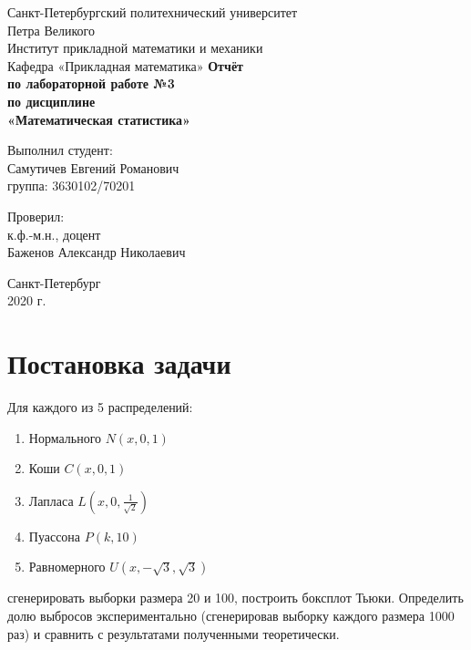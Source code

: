 \documentclass[12pt,a4paper]{article}
\begin{document}
	
\begin{titlepage}
	\begin{center}		
		\vfill	
		Санкт-Петербургский политехнический университет \\
		Петра Великого\\
		\vskip 1cm
		Институт прикладной математики и механики \\
		Кафедра «Прикладная математика»
		\vfill
		\textbf{Отчёт\\
			по лабораторной работе №3\\
			по дисциплине\\
			«Математическая статистика»\\}
		\vfill
	\end{center}
	\vfill
	\hfill
	\begin{minipage}{0.4\textwidth}
		Выполнил студент:\\
		Самутичев Евгений Романович\\
		группа: 3630102/70201\\
	\end{minipage}
	\vfill
	\hfill 
	\begin{minipage}{0.4\textwidth}
		Проверил:\\
		к.ф.-м.н., доцент\\
		Баженов Александр Николаевич\
	\end{minipage}
	\vfill
	\begin{center}
		Санкт-Петербург\\2020 г.
	\end{center}
\end{titlepage}

\tableofcontents
\listoffigures
\listoftables
\pagebreak

\section{Постановка задачи}
Для каждого из 5 распределений:

\begin{enumerate}
	\item Нормального $N(x, 0, 1)$
	\item Коши $C(x, 0, 1)$
	\item Лапласа $L(x, 0, \frac{1}{\sqrt{2}})$
	\item Пуассона $P(k, 10)$
	\item Равномерного $U(x, -\sqrt{3}, \sqrt{3})$	
\end{enumerate}

сгенерировать выборки размера 20 и 100, построить боксплот Тьюки. Определить долю выбросов экспериментально (сгенерировав выборку каждого размера 1000 раз) и сравнить с результатами полученными теоретически.
\pagebreak
\end{document}
